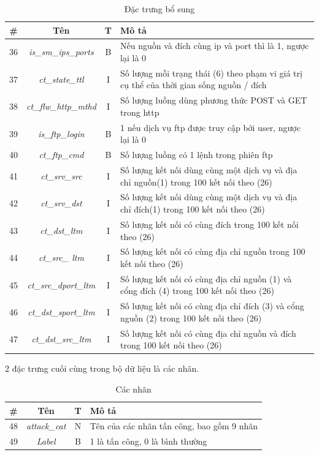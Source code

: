 \begin{table}[H]
    \centering
    \begin{tabular}{|c|c|c|m{8cm}|}
        \hline
        \textbf{\#}  & \textbf{Tên} & \textbf{T} & \textbf{Mô tả} \\
        \hline
        36 & \textit{is\_sm\_ips\_ports} & B & Nếu nguồn và đích cùng ip và port thì là 1, ngược lại là 0 \\
        \hline
        37 & \textit{ct\_state\_ttl} & I & Số lượng mỗi trạng thái (6) theo phạm vi giá trị cụ thể của thời gian sống nguồn / đích\\
        \hline
        38 & \textit{ct\_flw\_http\_mthd} & I & Số lượng luồng dùng phương thức POST và GET trong http\\
        \hline
        39 & \textit{is\_ftp\_login} & B & 1 nếu dịch vụ ftp được truy cập bởi user, ngược lại là 0\\
        \hline
        40 & \textit{ct\_ftp\_cmd} & B & Số lượng luồng có 1 lệnh trong phiên ftp\\
        \hline
        41 & \textit{ct\_srv\_src} & I & Số lượng kết nối dùng cùng một dịch vụ và địa chỉ nguồn(1) trong 100 kết nối theo (26)\\
        \hline
        42 & \textit{ct\_srv\_dst} & I & Số lượng kết nối dùng cùng một dịch vụ và địa chỉ đích(1) trong 100 kết nối theo (26) \\
        \hline
        43 & \textit{ct\_dst\_ltm} & I &  Số lượng kết nối có cùng đích trong 100 kết nối theo (26)\\
        \hline
        44 & \textit{ct\_src\_ ltm} & I & Số lượng kết nối có cùng địa chỉ nguồn trong 100 kết nối theo (26) \\
        \hline
        45 & \textit{ct\_src\_dport\_ltm} & I &  Số lượng kết nối có cùng địa chỉ nguồn (1) và cổng đích (4) trong 100 kết nối theo (26)\\
        \hline
        46 & \textit{ct\_dst\_sport\_ltm} & I &  Số lượng kết nối có cùng địa chỉ đích (3) và cổng nguồn (2) trong 100 kết nối theo (26)\\
        \hline
        47 & \textit{ct\_dst\_src\_ltm} & I & Số lượng kết nối có cùng địa chỉ nguồn và đích trong 100 kết nối theo (26) \\
        \hline
    \end{tabular}
    \caption{Đặc trưng bổ sung}
    
\end{table}

2 đặc trưng cuối cùng trong bộ dữ liệu là các nhãn. 
\begin{table}[H]
    \centering
    \begin{tabular}{|c|c|c|l|}
        \hline
        \textbf{\#}  & \textbf{Tên} & \textbf{T} & \textbf{Mô tả} \\
        \hline
        48 & \textit{attack\_cat} & N & Tên của các nhãn tấn công, bao gồm 9 nhãn \\
        \hline
        49 & \textit{Label} & B & 1 là tấn công, 0 là bình thường\\
        \hline
    \end{tabular}
    \caption{Các nhãn}
    
\end{table}
